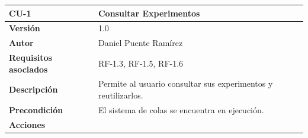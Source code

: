 \begin{longtable}[H]{@{}ll@{}}
\toprule
\begin{minipage}[b]{0.23\columnwidth}\raggedright\strut
\textbf{CU-1}\strut
\end{minipage} & \begin{minipage}[b]{0.71\columnwidth}\raggedright\strut
\textbf{Consultar Experimentos}\strut
\end{minipage}\tabularnewline
\midrule
\endhead
\begin{minipage}[t]{0.23\columnwidth}\raggedright\strut
\textbf{Versión}\strut
\end{minipage} & \begin{minipage}[t]{0.71\columnwidth}\raggedright\strut
1.0\strut
\end{minipage}\tabularnewline
\begin{minipage}[t]{0.23\columnwidth}\raggedright\strut
\textbf{Autor}\strut
\end{minipage} & \begin{minipage}[t]{0.71\columnwidth}\raggedright\strut
Daniel Puente Ramírez\strut
\end{minipage}\tabularnewline
\begin{minipage}[t]{0.23\columnwidth}\raggedright\strut
\textbf{Requisitos asociados}\strut
\end{minipage} & \begin{minipage}[t]{0.71\columnwidth}\raggedright\strut
RF-1.3, RF-1.5, RF-1.6\strut
\end{minipage}\tabularnewline
\begin{minipage}[t]{0.23\columnwidth}\raggedright\strut
\textbf{Descripción}\strut
\end{minipage} & \begin{minipage}[t]{0.71\columnwidth}\raggedright\strut
Permite al usuario consultar sus experimentos y reutilizarlos.\strut
\end{minipage}\tabularnewline
\begin{minipage}[t]{0.23\columnwidth}\raggedright\strut
\textbf{Precondición}\strut
\end{minipage} & \begin{minipage}[t]{0.71\columnwidth}\raggedright\strut
El sistema de colas se encuentra en ejecución.\strut
\end{minipage}\tabularnewline
\begin{minipage}[t]{0.23\columnwidth}\raggedright\strut
\textbf{Acciones}\strut
\end{minipage} & \begin{minipage}[t]{0.71\columnwidth}\raggedright\strut

\end{minipage}
\end{longtable}
